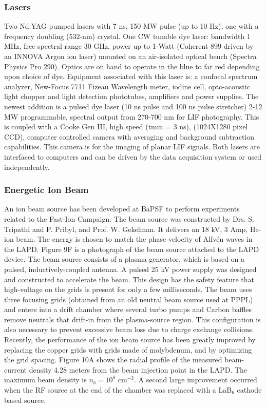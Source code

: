 \documentclass[11pt]{article}
\begin{document}
\subsubsection{Lasers}
Two Nd:YAG pumped lasers with 7 ns, 150 MW pulse (up to 10 Hz); one with a frequency doubling (532-nm) crystal.  One CW tunable dye laser: bandwidth 1 MHz, free spectral range 30 GHz, power up to 1-Watt (Coherent 899 driven by an INNOVA Argon ion laser) mounted on an air-isolated optical bench (Spectra Physics Pro 290).  Optics are on hand to operate in the blue to far red depending upon choice of dye. Equipment associated with this laser is: a confocal spectrum analyzer, New-Focus 7711 Fizeau Wavelength meter, iodine cell, opto-acoustic light chopper and light detection phototubes, amplifiers and power supplies.  The newest addition is a pulsed dye laser (10 ns pulse and 100 ns pulse stretcher) 2-12 MW programmable, spectral output from 270-700 nm for LIF photography.  This is coupled with a Cooke Gen III, high speed (tmin = 3 ns), (1024X1280 pixel CCD), computer controlled camera with averaging and background subtraction capabilities.  This camera is for the imaging of planar LIF signals. Both lasers are interfaced to computers and can be driven by the data acquisition system or used independently.

\subsubsection{Energetic Ion Beam}
An ion beam source has been developed at BaPSF to perform experiments related to the Fast-Ion Campaign.  The beam source was constructed by Drs. S. Tripathi and P. Pribyl, and Prof. W. Gekelman.  It delivers an 18 kV, 3 Amp, He-ion beam.  The energy is chosen to match the phase velocity of Alfv\'{e}n waves in the LAPD.  Figure 9F is a photograph of the beam source attached to the LAPD device.  The beam source consists of a plasma generator, which is based on a pulsed, inductively-coupled antenna.  A pulsed 25 kV power supply was designed and constructed to accelerate the beam.  This design has the safety feature that high-voltage on the grids is present for only a few milliseconds. 
 The beam uses three focusing grids (obtained from an old neutral beam source used at PPPL) and enters into a drift chamber where several turbo pumps and Carbon baffles remove neutrals that drift-in from the plasma-source region.  This configuration is also necessary to prevent excessive beam loss due to charge exchange collisions.
	Recently, the performance of the ion beam source has been greatly improved by replacing the copper grids with grids made of molybdenum, and by optimizing the grid spacing.  Figure 10A shows the radial profile of the measured beam-current density 4.28 meters from the beam injection point in the LAPD.  The maximum beam density is $n_{b} = 10^{8}$ cm$^{-3}$. A second large  improvement occurred when the RF source at the end of the chamber was replaced with a LaB$_{6}$ cathode based source.
\end{document}
